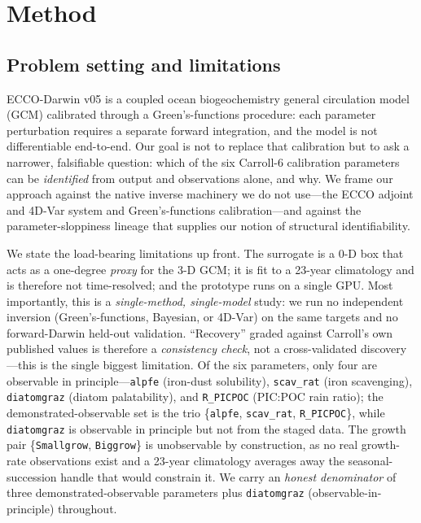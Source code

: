 \documentclass[11pt]{article}
\begin{document}
\section{Method}
\label{sec:method}

\subsection{Problem setting and limitations}

ECCO-Darwin v05 \cite{carroll2022} is a coupled ocean biogeochemistry general circulation model (GCM) calibrated through a Green's-functions procedure: each parameter perturbation requires a separate forward integration, and the model is not differentiable end-to-end. Our goal is not to replace that calibration but to ask a narrower, falsifiable question: which of the six Carroll-6 calibration parameters can be \emph{identified} from output and observations alone, and why. We frame our approach against the native inverse machinery we do not use---the ECCO adjoint and 4D-Var system \cite{heimbach2015,menemenlis2005} and Green's-functions calibration---and against the parameter-sloppiness lineage \cite{transtrum2012} that supplies our notion of structural identifiability.

We state the load-bearing limitations up front. The surrogate is a $0$-D box that acts as a one-degree \emph{proxy} for the 3-D GCM; it is fit to a 23-year climatology and is therefore not time-resolved; and the prototype runs on a single GPU. Most importantly, this is a \emph{single-method, single-model} study: we run no independent inversion (Green's-functions, Bayesian, or 4D-Var) on the same targets and no forward-Darwin held-out validation. ``Recovery'' graded against Carroll's own published values is therefore a \emph{consistency check}, not a cross-validated discovery---this is the single biggest limitation. Of the six parameters, only four are observable in principle---\texttt{alpfe} (iron-dust solubility), \texttt{scav\_rat} (iron scavenging), \texttt{diatomgraz} (diatom palatability), and \texttt{R\_PICPOC} (PIC:POC rain ratio); the demonstrated-observable set is the trio \{\texttt{alpfe}, \texttt{scav\_rat}, \texttt{R\_PICPOC}\}, while \texttt{diatomgraz} is observable in principle but not from the staged data. The growth pair \{\texttt{Smallgrow}, \texttt{Biggrow}\} is unobservable by construction, as no real growth-rate observations exist and a 23-year climatology averages away the seasonal-succession handle that would constrain it. We carry an \emph{honest denominator} of three demonstrated-observable parameters plus \texttt{diatomgraz} (observable-in-principle) throughout.
\end{document}
